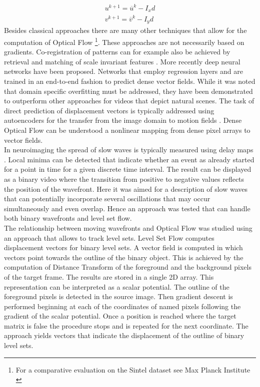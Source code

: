 \begin{equation}
  \begin{array}{l}
    u^{k+1}=\overline{u}^k - I_x d \\
    v^{k+1}=\overline{v}^k - I_y d
  \end{array}
\label{eqn:iterative_scheme}
\end{equation}
Besides classical approaches there are many other techniques that allow for the computation of Optical Flow \footnote{For a comparative evaluation on the Sintel dataset see Max Planck Institute \parencite*{mpi2020sintel}}. These approaches are not necessarily based on gradients. Co-registration of patterns can for example also be achieved by retrieval and matching of scale invariant features \parencite{zhang2014scale}. More recently deep neural networks have been proposed. Networks that employ regression layers and are trained in an end-to-end fashion to predict dense vector fields. While it was noted that domain specific overfitting must be addressed, they have been demonstrated to outperform other approaches for videos that depict natural scenes. The task of direct prediction of displacement vectors is typically addressed using autoencoders for the transfer from the image domain to motion fields \parencite{hur2020optical}. Dense Optical Flow can be understood a nonlinear mapping from dense pixel arrays to vector fields. \\
In neuroimaging the spread of slow waves is typically measured using delay maps \parencite{celotto2020analysis}. Local minima can be detected that indicate whether an event as already started for a point in time for a given discrete time interval. The result can be displayed as a binary video where the transition from positive to negative values reflects the position of the wavefront. Here it was aimed for a description of slow waves that can potentially incorporate several oscillations that may occur simultaneously and even overlap. Hence an approach was tested that can handle both binary wavefronts and level set flow. \\
The relationship between moving wavefronts and Optical Flow was studied using an approach that allows to track level sets. Level Set Flow computes displacement vectors for binary level sets. A vector field is computed in which vectors point towards the outline of the binary object. This is achieved by the computation of Distance Transform of the foreground and the background pixels of the target frame. The results are stored in a single 2D array. This representation can be interpreted as a scalar potential. The outline of the foreground pixels is detected in the source image. Then gradient descent is performed beginning at each of the coordinates of named pixels following the gradient of the scalar potential. Once a position is reached where the target matrix is false the procedure stops and is repeated for the next coordinate. The approach yields vectors that indicate the displacement of the outline of binary level sets.\\
